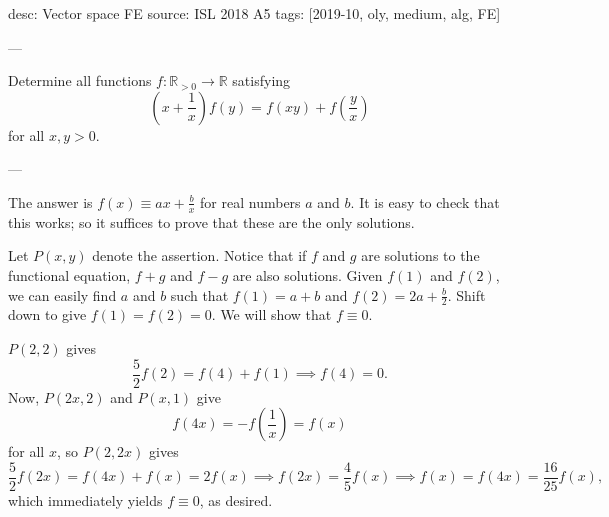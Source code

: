 desc: Vector space FE
source: ISL 2018 A5
tags: [2019-10, oly, medium, alg, FE]

---

Determine all functions $f:\mathbb R_{>0}\to\mathbb  R$ satisfying \[\left(x+\frac1x\right)f(y)=f(xy)+f\left(\frac yx\right)\]
for all $x,y>0$.

---

The answer is $f(x)\equiv ax+\tfrac bx$ for real numbers $a$ and $b$. It is easy to check that this works; so it suffices to prove that these are the only solutions.

Let $P(x,y)$ denote the assertion. Notice that if $f$ and $g$ are solutions to the functional equation, $f+g$ and $f-g$ are also solutions. Given $f(1)$ and $f(2)$, we can easily find $a$ and $b$ such that $f(1)=a+b$ and $f(2)=2a+\tfrac b2$. Shift down to give $f(1)=f(2)=0$. We will show that $f\equiv 0$.

$P(2,2)$ gives \[\frac52f(2)=f(4)+f(1)\implies f(4)=0.\]
Now, $P(2x,2)$ and $P(x,1)$ give \[f(4x)=-f\left(\frac1x\right)=f(x)\]
for all $x$, so $P(2,2x)$ gives \[\frac52f(2x)=f(4x)+f(x)=2f(x)\implies f(2x)=\frac45f(x)\implies f(x)=f(4x)=\frac{16}{25}f(x),\]
which immediately yields $f\equiv0$, as desired.
